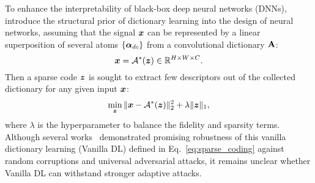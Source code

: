 



 To enhance the interpretability of black-box deep neural networks (DNNs),   
\citet{papyan2017convolutional, cazenavette2021architectural, mahdizadehaghdam2019deep, li2022revisiting} introduce the structural prior of dictionary learning into the design of neural networks, assuming that the signal ${\bm{x}}$ can be represented by a linear superposition of several atoms $\{{\bm{\alpha}}_{dc}\}$ from a convolutional dictionary ${\mathbf{A}}$:
\begin{equation}
   {\bm{x}} = {\mathcal{A}}^*({\bm{z}}) \in \mathbb{R}^{H \times W \times C}.
\end{equation} 
Then a sparse code ${\bm{z}}$ is sought to extract few descriptors out of the collected dictionary for any given input ${\bm{x}}$:
\begin{equation}
\min_{\bm{z}} \|{\bm{x}} - {\mathcal{A}}^*({\bm{z}})\|_2^2 + \lambda \|{\bm{z}}\|_1,
\label{eq:sparse_coding}
\end{equation}
where $\lambda$ is the hyperparameter to balance the fidelity and sparsity terms.
Although several works~\cite{cazenavette2021architectural, mahdizadehaghdam2019deep, li2022revisiting} demonstrated promising robustness of this vanilla dictionary learning (Vanilla DL) defined in Eq.~\eqref{eq:sparse_coding} against random corruptions and universal adversarial attacks, it remains unclear whether Vanilla DL can withstand stronger adaptive attacks.








